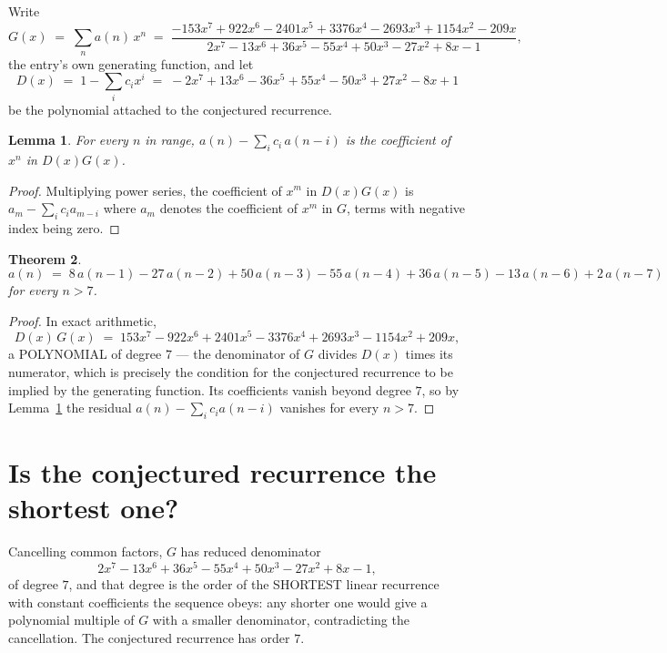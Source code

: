 \documentclass[11pt,a4paper]{article}
\theoremstyle{plain}
\newtheorem{theorem}{Theorem}
\newtheorem{lemma}[theorem]{Lemma}
\theoremstyle{definition}
\begin{document}
Write
\[
G(x)\;=\;\sum_{n}a(n)\,x^{n}\;=\;\frac{- 153 x^{7} + 922 x^{6} - 2401 x^{5} + 3376 x^{4} - 2693 x^{3} + 1154 x^{2} - 209 x}{2 x^{7} - 13 x^{6} + 36 x^{5} - 55 x^{4} + 50 x^{3} - 27 x^{2} + 8 x - 1},
\]
the entry's own generating function, and let
\[
D(x)\;=\;1-\sum_i c_i x^{i}\;=\;- 2 x^{7} + 13 x^{6} - 36 x^{5} + 55 x^{4} - 50 x^{3} + 27 x^{2} - 8 x + 1
\]
be the polynomial attached to the conjectured recurrence.

\begin{lemma}\label{lem:key}
For every $n$ in range, $a(n)-\sum_i c_i\,a(n-i)$ is the coefficient of $x^{n}$ in
$D(x)G(x)$.
\end{lemma}

\begin{proof}
Multiplying power series, the coefficient of $x^{m}$ in $D(x)G(x)$ is
$a_m-\sum_i c_i a_{m-i}$ where $a_m$ denotes the coefficient of $x^{m}$ in $G$, terms with
negative index being zero.
\end{proof}

\begin{theorem}
\[
a(n)\;=\;8\,a(n-1) - 27\,a(n-2) + 50\,a(n-3) - 55\,a(n-4) + 36\,a(n-5) - 13\,a(n-6) + 2\,a(n-7)
\]
for every $n>7$.
\end{theorem}

\begin{proof}
In exact arithmetic,
\[
D(x)\,G(x)\;=\;153 x^{7} - 922 x^{6} + 2401 x^{5} - 3376 x^{4} + 2693 x^{3} - 1154 x^{2} + 209 x,
\]
a POLYNOMIAL of degree $7$ --- the denominator of $G$ divides $D(x)$ times its numerator,
which is precisely the condition for the conjectured recurrence to be implied by the
generating function. Its coefficients vanish beyond degree $7$, so by
Lemma~\ref{lem:key} the residual $a(n)-\sum_ic_ia(n-i)$ vanishes for every
$n>7$.
\end{proof}

\section{Is the conjectured recurrence the shortest one?}

Cancelling common factors, $G$ has reduced denominator
\[
2 x^{7} - 13 x^{6} + 36 x^{5} - 55 x^{4} + 50 x^{3} - 27 x^{2} + 8 x - 1,
\]
of degree $7$, and that degree is the order of the SHORTEST linear recurrence with
constant coefficients the sequence obeys: any shorter one would give a polynomial multiple of
$G$ with a smaller denominator, contradicting the cancellation. The conjectured recurrence has
order $7$.
\end{document}
